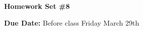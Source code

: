 
\usepackage{braket}

\def\ketY{\ensuremath{\ket {\Psi}}}
\def\iGeV{\ensuremath{\textrm{GeV}^{-1}}}
\def\mp{\ensuremath{m_{\textrm{proton}}}}
\def\rp{\ensuremath{r_{\textrm{proton}}}}
\def\me{\ensuremath{m_{\textrm{electron}}}}
\def\aG{\ensuremath{\alpha_G}}
\def\rAtom{\ensuremath{r_{\textrm{atom}}}}
\def\rNucl{\ensuremath{r_{\textrm{nucleus}}}}
\def\GN{\ensuremath{\textrm{G}_\textrm{N}}}

\def\be{\begin{equation*}}
\def\ee{\end{equation*}}


\usepackage{fancyhdr}
\usepackage{cancel}
\usepackage{ mathrsfs }





\fancyhf{}

\thispagestyle{fancy}






\begin{center}
{\huge \textbf{Homework Set \#8 }}
\large

{\textbf{ Due Date:} Before class Friday March 29th  } 
\end{center}

